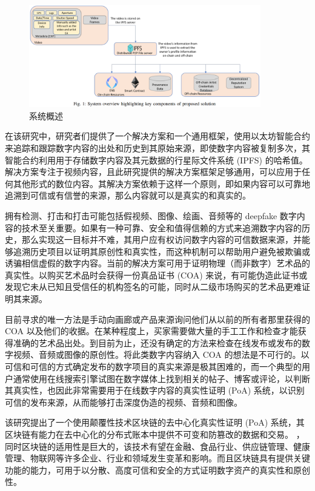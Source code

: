 \begin{figure}[htb]
\centering 
\includegraphics[width=0.90\textwidth]{img/p7m1.png} 
\caption{系统概述}
\label{Test}
\end{figure}

在该研究中，研究者们提供了一个解决方案和一个通用框架，使用以太坊智能合约来追踪和跟踪数字内容的出处和历史到其原始来源，即使数字内容被复制多次，其智能合约利用用于存储数字内容及其元数据的行星际文件系统 (IPFS) 的哈希值。解决方案专注于视频内容，且此研究提供的解决方案框架足够通用，可以应用于任何其他形式的数位内容。其解决方案依赖于这样一个原则，即如果内容可以可靠地追溯到可信或有信誉的来源，那么内容就可以是真实的和真实的。

拥有检测、打击和打击可能包括假视频、图像、绘画、音频等的 deepfake 数字内容的技术至关重要。如果有一种可靠、安全和值得信赖的方式来追溯数字内容的历史，那么实现这一目标并不难，其用户应有权访问数字内容的可信数据来源，并能够追溯历史项目以证明其原创性和真实性，而这种机制可以帮助用户避免被欺骗或诱骗相信虚假的数字内容。当前的解决方案可用于证明物理（而非数字）艺术品的真实性。以购买艺术品时会获得一份真品证书 (COA) 来说，有可能伪造此证书或发现它未从已知且受信任的机构签名的可能，同时从二级市场购买的艺术品更难证明其来源。

目前寻求的唯一方法是手动向画廊或产品来源询问他们从以前的所有者那里获得的 COA 以及他们的收据。在某种程度上，买家需要做大量的手工工作和检查才能获得准确的艺术品出处。到目前为止，还没有确定的方法来检查在线发布或发布的数字视频、音频或图像的原创性。将此类数字内容纳入 COA 的想法是不可行的。以可信和可信的方式确定发布的数字项目的真实来源是极其困难的，而一个典型的用户通常使用在线搜索引擎试图在数字媒体上找到相关的帖子、博客或评论，以判断其真实性，也因此非常需要用于在线数字内容的真实性证明 (PoA) 系统，以识别可信的发布来源，从而能够打击深度伪造的视频、音频和图像。

该研究提出了一个使用颠覆性技术区块链的去中心化真实性证明 (PoA) 系统，其区块链有能力在去中心化的分布式账本中提供不可变和防篡改的数据和交易。 ，同时区块链的适用性是巨大的，该技术有望在金融、食品行业、供应链管理、健康管理、物联网等许多企业、行业和领域发生变革和影响。而且区块链具有提供关键功能的能力，可用于以分散、高度可信和安全的方式证明数字资产的真实性和原创性。

